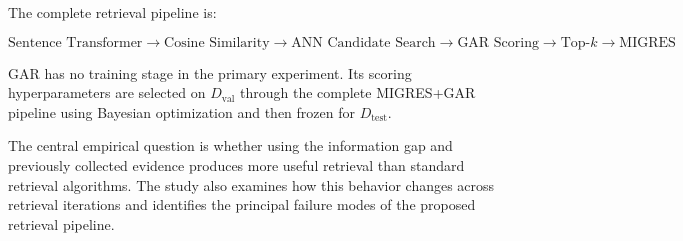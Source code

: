 \documentclass[11pt,a4paper]{article}
\begin{document}
The complete retrieval pipeline is:

\[
\boxed{
\text{Sentence Transformer}
\rightarrow
\text{Cosine Similarity}
\rightarrow
\text{ANN Candidate Search}
\rightarrow
\text{GAR Scoring}
\rightarrow
\text{Top-}k
\rightarrow
\text{MIGRES}
}
\]

GAR has no training stage in the primary experiment. Its scoring hyperparameters are selected on $D_{\mathrm{val}}$ through the complete MIGRES+GAR pipeline using Bayesian optimization and then frozen for $D_{\mathrm{test}}$.

The central empirical question is whether using the information gap and previously collected evidence produces more useful retrieval than standard retrieval algorithms. The study also examines how this behavior changes across retrieval iterations and identifies the principal failure modes of the proposed retrieval pipeline.



\end{document}
